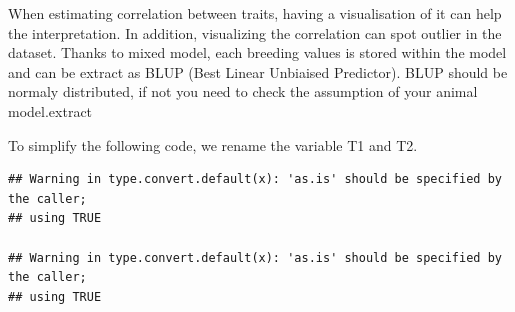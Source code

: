 \documentclass[
  12pt,
]{book}
\newenvironment{Shaded}{\begin{snugshade}}{\end{snugshade}}
\newcommand{\CommentTok}[1]{\textcolor[rgb]{0.56,0.35,0.01}{\textit{#1}}}
\newcommand{\DataTypeTok}[1]{\textcolor[rgb]{0.13,0.29,0.53}{#1}}
\newcommand{\DecValTok}[1]{\textcolor[rgb]{0.00,0.00,0.81}{#1}}
\newcommand{\FloatTok}[1]{\textcolor[rgb]{0.00,0.00,0.81}{#1}}
\newcommand{\KeywordTok}[1]{\textcolor[rgb]{0.13,0.29,0.53}{\textbf{#1}}}
\newcommand{\NormalTok}[1]{#1}
\newcommand{\OperatorTok}[1]{\textcolor[rgb]{0.81,0.36,0.00}{\textbf{#1}}}
\newcommand{\StringTok}[1]{\textcolor[rgb]{0.31,0.60,0.02}{#1}}
\begin{document}
When estimating correlation between traits, having a visualisation of it can help the interpretation. In addition, visualizing the correlation can spot outlier in the dataset.
Thanks to mixed model, each breeding values is stored within the model and can be extract as BLUP (Best Linear Unbiaised Predictor).
BLUP should be normaly distributed, if not you need to check the assumption of your animal model.extract

To simplify the following code, we rename the variable T1 and T2.

\begin{Shaded}
\end{Shaded}

\begin{verbatim}
## Warning in type.convert.default(x): 'as.is' should be specified by the caller;
## using TRUE

## Warning in type.convert.default(x): 'as.is' should be specified by the caller;
## using TRUE
\end{verbatim}
\end{document}
